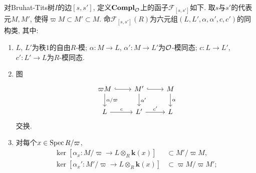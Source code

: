 对Bruhat-Tits树$I$的边$[s, s']$, 定义$\mathbf{Compl}_{\mathcal{O}}$上的函子$\mathcal{F}_{[s, s']}$如下. 取$s$与$s'$的代表元$M, M'$, 使得$\varpi M\subset M'\subset M$.
命$\mathcal{F}_{[s, s']}(R)$为六元组$(L, L', \alpha, \alpha', c, c')$的同构类, 其中:
\begin{enumerate}
    \item [\myit] $L$, $L'$为秩$1$的自由$R$-模; $\alpha : M \to L$, $\alpha' : M \to L'$为$\mathcal{O}$-模同态; $c : L\to L'$, $c' : L' \to L$为$R$-模同态.
    \item [\myit] 图\begin{equation}\label{diag : def edge functor}
    \begin{tikzcd}
    \varpi M \arrow[d, "\alpha/\varpi"] \arrow[r, hook] & M' \arrow[r, hook] \arrow[d, "\alpha'"] & M \arrow[d, "\alpha"] \\
    L \arrow[r, "c"]                                    & L' \arrow[r, "c'"]                      & L                    
    \end{tikzcd}\end{equation} 交换.
    \item [\myit] 对每个$x\in \operatorname{Spec} R/\varpi$, \begin{align*}
        \ker[\alpha_x : M/\varpi\to L\otimes_R \mathbf{k}(x)]&\subset M'/\varpi M,\\
        \ker[\alpha_x' : M'/\varpi \to L\otimes_R \mathbf{k}(x)] &\subset \varpi M/\varpi M';
    \end{align*}
\end{enumerate}

